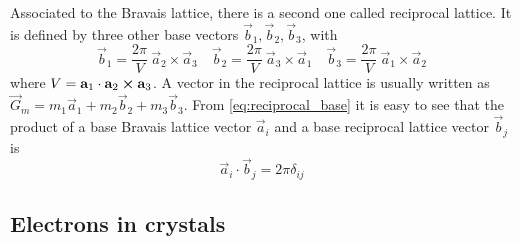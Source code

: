 Associated to the Bravais lattice, there is a second one called reciprocal lattice. It is defined by three other base vectors $\vec{b}_1, \vec{b}_2, \vec{b}_3$, with
\begin{equation} \label{eq:reciprocal_base}
    \vec{b}_1 = \frac{2\pi}{V} \ \vec{a}_2 \times \vec{a}_3 \quad
    \vec{b}_2 = \frac{2\pi}{V} \ \vec{a}_3 \times \vec{a}_1
    \quad
    \vec{b}_3 = \frac{2\pi}{V} \ \vec{a}_1 \times \vec{a}_2
\end{equation}
where $V = \mathbf{a}_1 \cdot \mathbf{a}_2 \cross \mathbf{a}_3$. A vector in the reciprocal lattice is usually written as $\vec{G}_m = m_1\vec{a}_1 + m_2\vec{b}_2 + m_3\vec{b}_3$. From \cref{eq:reciprocal_base} it is easy to see that the product of a base Bravais lattice vector $\vec{a}_i$ and a base reciprocal lattice vector $\vec{b}_j$ is
\begin{equation}
    \vec{a}_i \cdot \vec{b}_j = 2\pi \delta_{ij}
\end{equation}

\subsection{Electrons in crystals}